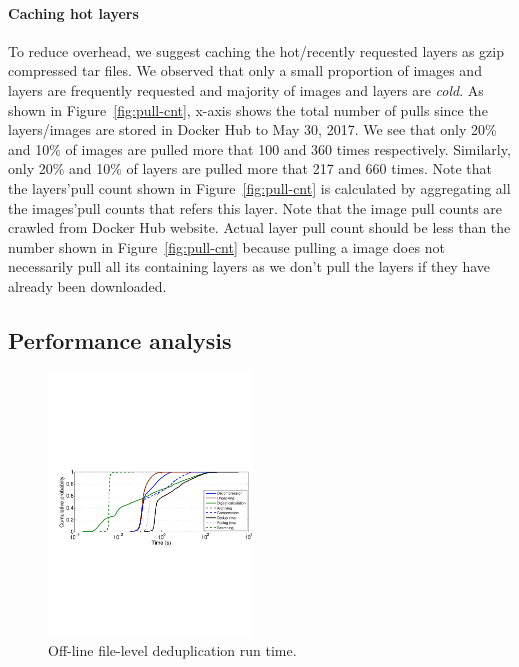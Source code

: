 \paragraph{Caching hot layers}
To reduce overhead, we suggest caching the hot/recently requested layers as
gzip compressed tar files. We observed that only a small proportion of images
and layers are frequently requested and majority of images and layers are
\textit{cold}. As shown in Figure~\ref{fig:pull-cnt}, x-axis shows the total
number of pulls since the layers/images are stored in Docker Hub to May 30,
2017.  We see that only 20\% and 10\% of images are pulled more that 100 and
360 times respectively.  Similarly, only 20\% and 10\% of layers are pulled
more that 217 and 660 times.  Note that the layers'pull count shown in
Figure~\ref{fig:pull-cnt} is calculated by aggregating all the images'pull
counts that refers this layer.  Note that the image pull counts are crawled
from Docker Hub website.  Actual layer pull count should be less than the
number shown in Figure~\ref{fig:pull-cnt} because pulling a image does not
necessarily pull all its containing layers as we don't pull the layers if they
have already been downloaded.

\subsection{Performance analysis}
%
\begin{figure}
	\centering
	\includegraphics[width=0.48\textwidth]{graphs/res-time.pdf}
	\caption{Off-line file-level deduplication run time.
	}
	\label{fig:dedup-res}
\end{figure}

%
%
%

